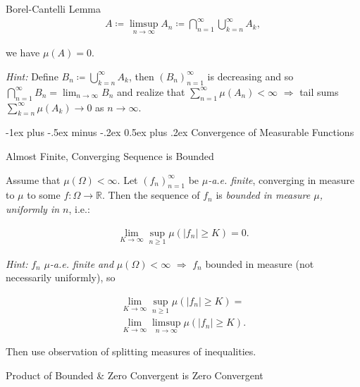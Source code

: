 \documentclass[10pt,landscape]{article}
\makeatletter
\renewcommand{\geq}{\geqslant}
\newcommand{\Hint}{\textit{Hint: }}
\renewcommand{\section}{\@startsection{section}{1}{0mm}%
                                {-1ex plus -.5ex minus -.2ex}%
                                {0.5ex plus .2ex}%
                                {\normalfont\large\bfseries}}
\makeatother
\begin{document}
\begin{multicols}{3}
\begin{lemma}{4.4}{Borel-Cantelli Lemma}
        \begin{align*}
            A \coloneqq \limsup_{n \to \infty} A_n \coloneqq \bigcap_{n=1}^{\infty} \bigcup_{k=n}^{\infty} A_k,
        \end{align*}

    we have $\mu(A) = 0$.

    \Hint Define $B_n \coloneqq \bigcup_{k=n}^{\infty} A_k$, then $(B_n)_{n=1}^\infty$ is decreasing and so $\bigcap_{n=1}^{\infty} B_n = \lim_{n \to \infty} B_n$ and realize that $\sum_{n=1}^{\infty} \mu(A_n) < \infty$ $\Rightarrow$ tail sums $\sum_{k=n}^{\infty} \mu(A_k) \to 0$ as $n \to \infty$.

\end{lemma}


\section{Convergence of Measurable Functions}

\begin{exercise}{5.2}{Almost Finite, Converging Sequence is Bounded}

    Assume that $\mu(\Omega) < \infty$. Let $(f_n)_{n=1}^{\infty}$ be \emph{$\mu$-a.e. finite}, converging in measure to $\mu$ to some $f: \Omega \to \mathbb{R}$. Then the sequence of $f_n$ is \emph{bounded in measure $\mu$, uniformly in $n$}, i.e.:

        \begin{align*}
            \lim_{K \to \infty} \sup_{n \geq 1} \mu(|f_n| \geq K) = 0.
        \end{align*}

    \Hint $f_n$ \emph{$\mu$-a.e. finite} \emph{and} $\mu(\Omega) < \infty$ $\Rightarrow$ $f_n$ bounded in measure (not necessarily uniformly), so

        \begin{align*}
            \lim_{K \to \infty} \sup_{n \geq 1} \mu(|f_n| \geq K) = \\ \lim_{K \to \infty} \limsup_{n \to \infty} \mu(|f_n| \geq K).
        \end{align*}

    Then use observation of splitting measures of inequalities.

\end{exercise}

\begin{exercise}{5.3}{Product of Bounded \& Zero Convergent is Zero Convergent}


\end{exercise}
\end{multicols}
\end{document}

